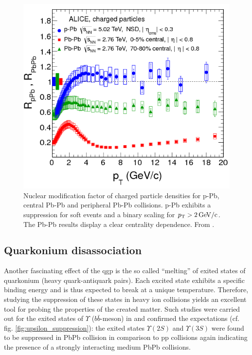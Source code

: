 \begin{figure}
  \centering
  \includegraphics[width=.6\textwidth]{figures/RAA_pPb_PbPb_Alice.png}
  \caption[Nuclear modification factor of charged particle densities for p-Pb, central Pb-Pb and peripheral Pb-Pb collisions.]{Nuclear modification factor of charged particle densities for p-Pb, central Pb-Pb and peripheral Pb-Pb collisions. p-Pb exhibits a suppression for soft events and a binary scaling for $p_{\text{T}} > \SI{2}{GeV/c}$. The Pb-Pb results display a clear centrality dependence. From \cite{Abelev2013}.}
  \label{fig:RAA}
\end{figure}

\subsection{Quarkonium disassociation}
\label{sec:quarkonium}

Another fascinating effect of the \gls{qgp} is the so called ``melting'' of exited states of quarkonium (heavy quark-antiquark pairs). Each excited state exhibits a specific binding energy and is thus expected to break at a unique temperature. Therefore, studying the suppression of these states in heavy ion collisions yields an excellent tool for probing the properties of the created matter. Such studies were carried out for the exited states of $\Upsilon$ ($b\bar{b}$-meson) in \cite{Chatrchyan2011} and confirmed the expectations (cf. fig. \ref{fig:upsilon_suppression}): the exited states $\Upsilon(2S)$ and $\Upsilon(3S)$ were found to be suppressed in \gls{PbPb} collision in comparison to \gls{pp} collisions again indicating the presence of a strongly interacting medium \gls{PbPb} collisions.

